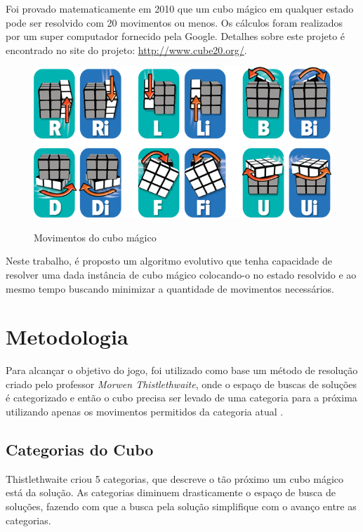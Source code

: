 \documentclass[12pt]{article}
\begin{document}
  Foi provado matematicamente em 2010 que um cubo mágico em qualquer estado pode ser resolvido com 20 movimentos ou menos. Os cálculos foram realizados por um super computador fornecido pela Google. Detalhes sobre este projeto é encontrado no site do projeto: \url{http://www.cube20.org/}.

  \begin{figure}[!ht]
    \centering
    \caption{Movimentos do cubo mágico}
    \includegraphics[scale=1.8]{images/moves.png}
    \label{fig:moves}
  \end{figure}

  Neste trabalho, é proposto um algoritmo evolutivo que tenha capacidade de resolver uma dada instância de cubo mágico colocando-o no estado resolvido e ao mesmo tempo buscando minimizar a quantidade de movimentos necessários.

\section{Metodologia}
  Para alcançar o objetivo do jogo, foi utilizado como base um método de resolução criado pelo professor \textit{Morwen Thistlethwaite}, onde o espaço de buscas de soluções é categorizado e então o cubo precisa ser levado de uma categoria para a próxima utilizando apenas os movimentos permitidos da categoria atual \cite{thistlethwaite}.

  \subsection{Categorias do Cubo}
    Thistlethwaite criou 5 categorias, que descreve o tão próximo um cubo mágico está da solução. As categorias diminuem drasticamente o espaço de busca de soluções, fazendo com que a busca pela solução simplifique com o avanço entre as categorias.
\end{document}
